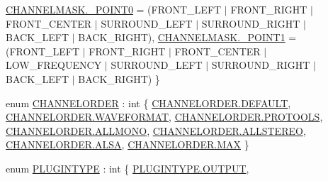 \begin{DoxyCompactItemize}
\newline
\hyperlink{namespace_f_m_o_d_ae295945ff00acb5f2e5ef0b3f217f5e2aced5adeae4535e66f4751ba4da0e862c}{C\+H\+A\+N\+N\+E\+L\+M\+A\+S\+K.\+\_\+P\+O\+I\+N\+T0} = (F\+R\+O\+N\+T\+\_\+\+L\+E\+FT $\vert$ F\+R\+O\+N\+T\+\_\+\+R\+I\+G\+HT $\vert$ F\+R\+O\+N\+T\+\_\+\+C\+E\+N\+T\+ER $\vert$ S\+U\+R\+R\+O\+U\+N\+D\+\_\+\+L\+E\+FT $\vert$ S\+U\+R\+R\+O\+U\+N\+D\+\_\+\+R\+I\+G\+HT $\vert$ B\+A\+C\+K\+\_\+\+L\+E\+FT $\vert$ B\+A\+C\+K\+\_\+\+R\+I\+G\+HT), 
\hyperlink{namespace_f_m_o_d_ae295945ff00acb5f2e5ef0b3f217f5e2aac47894ed2316167b53088fe4e94f30b}{C\+H\+A\+N\+N\+E\+L\+M\+A\+S\+K.\+\_\+P\+O\+I\+N\+T1} = (F\+R\+O\+N\+T\+\_\+\+L\+E\+FT $\vert$ F\+R\+O\+N\+T\+\_\+\+R\+I\+G\+HT $\vert$ F\+R\+O\+N\+T\+\_\+\+C\+E\+N\+T\+ER $\vert$ L\+O\+W\+\_\+\+F\+R\+E\+Q\+U\+E\+N\+CY $\vert$ S\+U\+R\+R\+O\+U\+N\+D\+\_\+\+L\+E\+FT $\vert$ S\+U\+R\+R\+O\+U\+N\+D\+\_\+\+R\+I\+G\+HT $\vert$ B\+A\+C\+K\+\_\+\+L\+E\+FT $\vert$ B\+A\+C\+K\+\_\+\+R\+I\+G\+HT)
 \}
\item 
enum \hyperlink{namespace_f_m_o_d_abedeb99eb6485be64623516ff974fa6f}{C\+H\+A\+N\+N\+E\+L\+O\+R\+D\+ER} \+: int \{ \newline
\hyperlink{namespace_f_m_o_d_abedeb99eb6485be64623516ff974fa6fa5b39c8b553c821e7cddc6da64b5bd2ee}{C\+H\+A\+N\+N\+E\+L\+O\+R\+D\+E\+R.\+D\+E\+F\+A\+U\+LT}, 
\hyperlink{namespace_f_m_o_d_abedeb99eb6485be64623516ff974fa6fa7cbc1e4a7ad85cbeb0fcb13dd5d37a8f}{C\+H\+A\+N\+N\+E\+L\+O\+R\+D\+E\+R.\+W\+A\+V\+E\+F\+O\+R\+M\+AT}, 
\hyperlink{namespace_f_m_o_d_abedeb99eb6485be64623516ff974fa6fae143d09c1c0b28325fb4dad8ffb19dae}{C\+H\+A\+N\+N\+E\+L\+O\+R\+D\+E\+R.\+P\+R\+O\+T\+O\+O\+LS}, 
\hyperlink{namespace_f_m_o_d_abedeb99eb6485be64623516ff974fa6faa10bcaa68b106af53993fd99b1574af4}{C\+H\+A\+N\+N\+E\+L\+O\+R\+D\+E\+R.\+A\+L\+L\+M\+O\+NO}, 
\newline
\hyperlink{namespace_f_m_o_d_abedeb99eb6485be64623516ff974fa6facf79dc77399b7cd6faa65024479f80ed}{C\+H\+A\+N\+N\+E\+L\+O\+R\+D\+E\+R.\+A\+L\+L\+S\+T\+E\+R\+EO}, 
\hyperlink{namespace_f_m_o_d_abedeb99eb6485be64623516ff974fa6fa471f5b090bf3497f1eabebca59dd0ce8}{C\+H\+A\+N\+N\+E\+L\+O\+R\+D\+E\+R.\+A\+L\+SA}, 
\hyperlink{namespace_f_m_o_d_abedeb99eb6485be64623516ff974fa6fa26a4b44a837bf97b972628509912b4a5}{C\+H\+A\+N\+N\+E\+L\+O\+R\+D\+E\+R.\+M\+AX}
 \}
\item 
enum \hyperlink{namespace_f_m_o_d_ad838bca9e846c3461c840ea9865dfcea}{P\+L\+U\+G\+I\+N\+T\+Y\+PE} \+: int \{ \hyperlink{namespace_f_m_o_d_ad838bca9e846c3461c840ea9865dfceaa50a87f0d71f7221582dad4bf507a0f34}{P\+L\+U\+G\+I\+N\+T\+Y\+P\+E.\+O\+U\+T\+P\+UT}, 

\end{DoxyCompactItemize}
